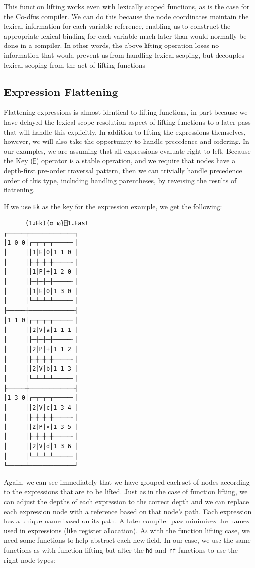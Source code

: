 ﻿\documentclass[numbers,10pt,preprint]{sigplanconf}
\begin{document}
This function lifting works even with lexically scoped functions, as is the case for the Co-dfns compiler. We can do this because the node coordinates maintain the lexical information for each variable reference, enabling us to construct the appropriate lexical binding for each variable much later than would normally be done in a compiler. In other words, the above lifting operation loses no information that would prevent us from handling lexical scoping, but decouples lexical scoping from the act of lifting functions.

\subsection{Expression Flattening}

Flattening expressions is almost identical to lifting functions, in part because we have delayed the lexical scope resolution aspect of lifting functions to a later pass that will handle this explicitly. In addition to lifting the expressions themselves, however, we will also take the opportunity to handle precedence and ordering. In our examples, we are assuming that all expressions evaluate right to left. Because the Key (\verb;⌸;) operator is a stable operation, and we require that nodes have a depth-first pre-order traversal pattern, then we can trivially handle precedence order of this type, including handling parentheses, by reversing the results of flattening.

If we use \verb;Ek; as the key for the expression example, we get the following:

\begin{verbatim}
      (1↓Ek){⍺ ⍵}⌸1↓East
┌─────┬─────────────┐
│1 0 0│┌─┬─┬─┬─────┐│
│     ││1│E│0│1 1 0││
│     │├─┼─┼─┼─────┤│
│     ││1│P│÷│1 2 0││
│     │├─┼─┼─┼─────┤│
│     ││1│E│0│1 3 0││
│     │└─┴─┴─┴─────┘│
├─────┼─────────────┤
│1 1 0│┌─┬─┬─┬─────┐│
│     ││2│V│a│1 1 1││
│     │├─┼─┼─┼─────┤│
│     ││2│P│+│1 1 2││
│     │├─┼─┼─┼─────┤│
│     ││2│V│b│1 1 3││
│     │└─┴─┴─┴─────┘│
├─────┼─────────────┤
│1 3 0│┌─┬─┬─┬─────┐│
│     ││2│V│c│1 3 4││
│     │├─┼─┼─┼─────┤│
│     ││2│P│×│1 3 5││
│     │├─┼─┼─┼─────┤│
│     ││2│V│d│1 3 6││
│     │└─┴─┴─┴─────┘│
└─────┴─────────────┘
\end{verbatim}

\noindent Again, we can see immediately that we have grouped each set of nodes according to the expressions that are to be lifted. Just as in the case of function lifting, we can adjust the depths of each expression to the correct depth and we can replace each expression node with a reference based on that node’s path. Each expression has a unique name based on its path. A later compiler pass minimizes the names used in expressions (like register allocation). As with the function lifting case, we need some functions to help abstract each new field. In our case, we use the same functions as with function lifting but alter the \verb;hd; and \verb;rf; functions to use the right node types:
\end{document}
